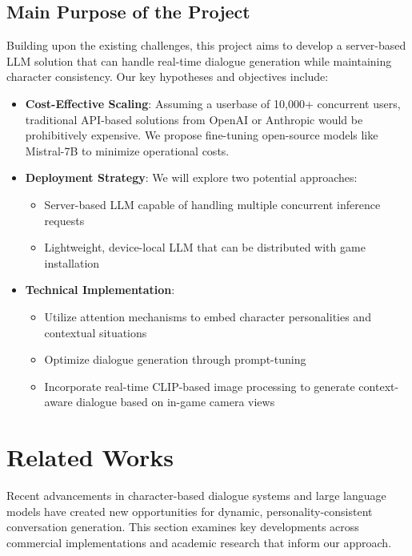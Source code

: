 \documentclass{article}
\begin{document}
\subsection{Main Purpose of the Project}
Building upon the existing challenges, this project aims to develop a server-based LLM solution that can handle real-time dialogue generation while maintaining character consistency. Our key hypotheses and objectives include:
\begin{itemize}
\item \textbf{Cost-Effective Scaling}: Assuming a userbase of 10,000+ concurrent users, traditional API-based solutions from OpenAI or Anthropic would be prohibitively expensive. We propose fine-tuning open-source models like Mistral-7B to minimize operational costs.
\item \textbf{Deployment Strategy}: We will explore two potential approaches:
    \begin{itemize}
        \item Server-based LLM capable of handling multiple concurrent inference requests
        \item Lightweight, device-local LLM that can be distributed with game installation
    \end{itemize}

\item \textbf{Technical Implementation}:
    \begin{itemize}
        \item Utilize attention mechanisms to embed character personalities and contextual situations
        \item Optimize dialogue generation through prompt-tuning
        \item Incorporate real-time CLIP-based image processing to generate context-aware dialogue based on in-game camera views
    \end{itemize}
\end{itemize}



\section{Related Works}
Recent advancements in character-based dialogue systems and large language models have created new opportunities for dynamic, personality-consistent conversation generation. This section examines key developments across commercial implementations and academic research that inform our approach.
\end{document}
